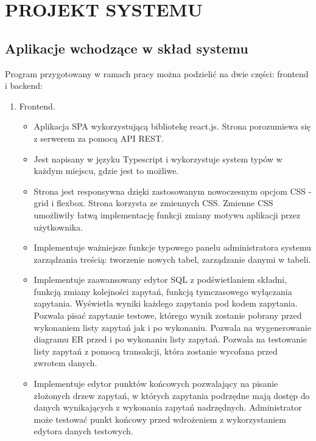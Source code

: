 \section{PROJEKT SYSTEMU}

\subsection{Aplikacje wchodzące w skład systemu}

Program przygotowany w ramach pracy można podzielić na dwie części: frontend i
backend:

\begin{enumerate}
    \item Frontend.

    \begin{itemize}

        \item Aplikacja SPA wykorzystującą bibliotekę react.js. Strona
        porozumiewa się z serwerem za pomocą API REST.
        
        \item Jest napisany w języku Typescript i wykorzystuje system typów w
        każdym miejscu, gdzie jest to możliwe.

        \item Strona jest responsywna dzięki zastosowanym nowoczesnym opcjom CSS
        - grid i flexbox. Strona korzysta ze zmiennych CSS. Zmienne CSS
        umożliwiły łatwą implementację funkcji zmiany motywu aplikacji przez
        użytkownika.

        \item Implementuje ważniejsze funkcje typowego panelu administratora
        systemu zarządzania treścią: tworzenie nowych tabel, zarządzanie danymi
        w tabeli.

        \item Implementuje zaawansowany edytor SQL z podświetlaniem składni,
        funkcją zmiany kolejności zapytań, funkcją tymczasowego wyłączania
        zapytania. Wyświetla wyniki każdego zapytania pod kodem zapytania.
        Pozwala pisać zapytanie testowe, którego wynik zostanie pobrany przed
        wykonaniem listy zapytań jak i po wykonaniu. Pozwala na wygenerowanie
        diagramu ER przed i po wykonaniu listy zapytań. Pozwala na testowanie
        listy zapytań z pomocą transakcji, która zostanie wycofana przed zwrotem
        danych.

        \item Implementuje edytor punktów końcowych pozwalający na pisanie
        złożonych drzew zapytań, w których zapytania podrzędne mają dostęp do
        danych wynikających z wykonania zapytań nadrzędnych. Administrator może
        testować punkt końcowy przed wdrożeniem z wykorzystaniem edytora danych
        testowych.


\end{itemize}
\end{enumerate}

